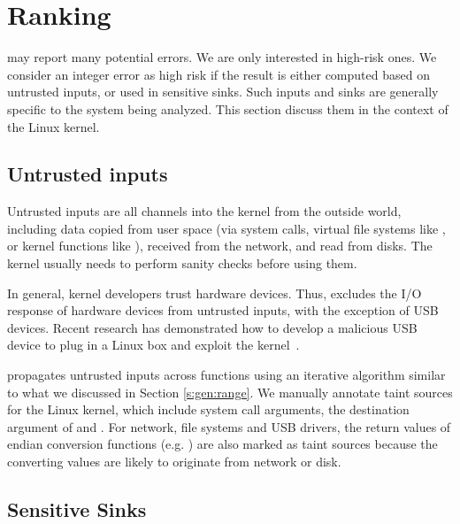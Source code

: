 \section{Ranking}
\label{s:rank}

\sys may report many potential errors.  We are only interested
in high-risk ones.  We consider an integer error as high risk if the
result is either computed based on untrusted inputs, or used in
sensitive sinks.  Such inputs and sinks are generally specific to
the system being analyzed.  This section discuss them in the context
of the Linux kernel.

\subsection{Untrusted inputs}
\label{s:rank:input}

Untrusted inputs are all channels into the kernel from the outside world,
including data copied from user space (via system calls, virtual file
systems like , or kernel functions like ),
received from the network, and read from disks. The kernel usually needs to
perform sanity checks before using them. 

In general, kernel developers trust hardware devices. Thus, \sys
excludes the I/O response of hardware devices from untrusted inputs,
with the exception of USB devices.  Recent research has demonstrated
how to develop a malicious USB device to plug in a Linux box and
exploit the kernel~\cite{usb:buffer-overflow}.

\sys propagates untrusted inputs across functions using an iterative algorithm
similar to what we discussed in Section \ref{s:gen:range}. We manually annotate
taint sources for the Linux kernel, which include system call arguments, the
destination argument of  and . For network,
file systems and USB drivers, the return values of endian conversion functions
(e.g. ) are also marked as taint sources because the
converting values are likely to originate from network or disk.




\subsection{Sensitive Sinks}

